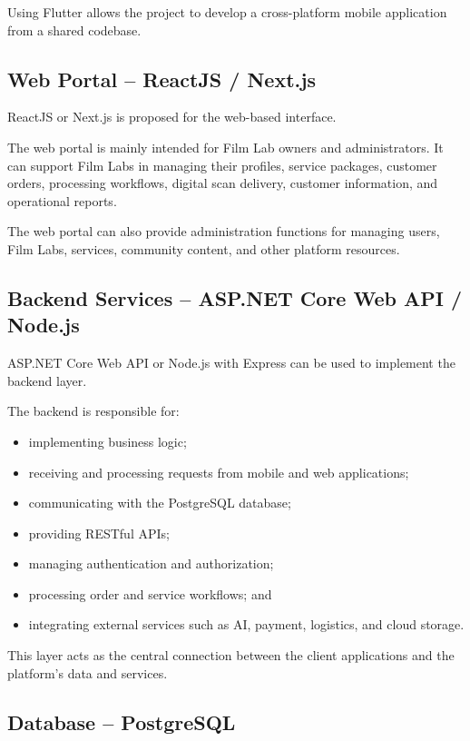 Using Flutter allows the project to develop a cross-platform mobile application
from a shared codebase.

\subsection{Web Portal -- ReactJS / Next.js}

ReactJS or Next.js is proposed for the web-based interface.

The web portal is mainly intended for Film Lab owners and administrators. It
can support Film Labs in managing their profiles, service packages, customer
orders, processing workflows, digital scan delivery, customer information,
and operational reports.

The web portal can also provide administration functions for managing users,
Film Labs, services, community content, and other platform resources.

\subsection{Backend Services -- ASP.NET Core Web API / Node.js}

ASP.NET Core Web API or Node.js with Express can be used to implement the
backend layer.

The backend is responsible for:

\begin{itemize}
    \item implementing business logic;
    \item receiving and processing requests from mobile and web applications;
    \item communicating with the PostgreSQL database;
    \item providing RESTful APIs;
    \item managing authentication and authorization;
    \item processing order and service workflows; and
    \item integrating external services such as AI, payment, logistics, and
    cloud storage.
\end{itemize}

This layer acts as the central connection between the client applications and
the platform's data and services.

\subsection{Database -- PostgreSQL}

